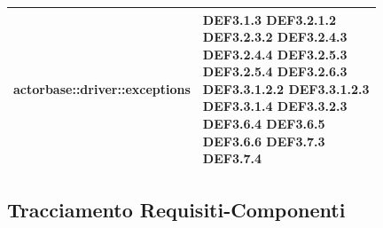 \documentclass{scalatekids-article}
\begin{document}
\begin{longtable}[H]{|p{9cm}|p{8cm}|}
\hline
actorbase::driver::exceptions & \multiLineCell[t]{DEF3.1.3 DEF3.2.1.2\\DEF3.2.3.2 DEF3.2.4.3\\DEF3.2.4.4 DEF3.2.5.3\\DEF3.2.5.4 DEF3.2.6.3\\DEF3.3.1.2.2 DEF3.3.1.2.3\\DEF3.3.1.4 DEF3.3.2.3\\DEF3.6.4 DEF3.6.5\\DEF3.6.6 DEF3.7.3\\DEF3.7.4\\}\\
\hline
\end{longtable}




\subsection{Tracciamento Requisiti-Componenti}
\end{document}

